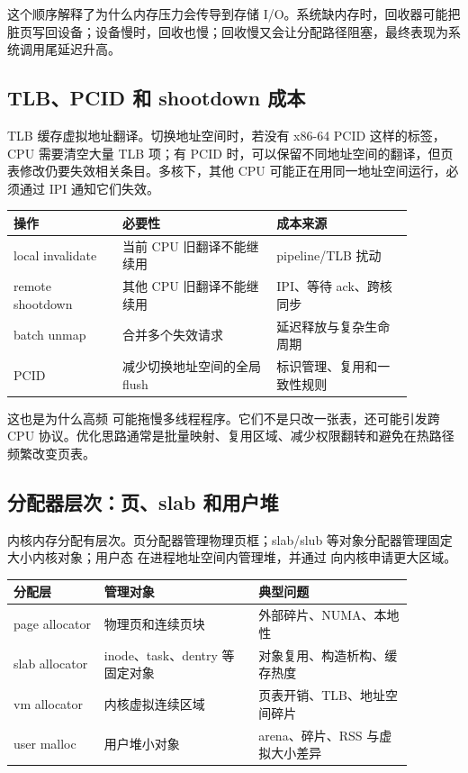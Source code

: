 这个顺序解释了为什么内存压力会传导到存储 I/O。系统缺内存时，回收器可能把脏页写回设备；设备慢时，回收也慢；回收慢又会让分配路径阻塞，最终表现为系统调用尾延迟升高。

\subsection{TLB、PCID 和 shootdown 成本}

TLB 缓存虚拟地址翻译。切换地址空间时，若没有 x86-64 PCID 这样的标签，CPU 需要清空大量 TLB 项；有 PCID 时，可以保留不同地址空间的翻译，但页表修改仍要失效相关条目。多核下，其他 CPU 可能正在用同一地址空间运行，必须通过 IPI 通知它们失效。

\begin{longtable}{|p{0.24\linewidth}|p{0.34\linewidth}|p{0.3\linewidth}|}
\toprule
操作 & 必要性 & 成本来源 \\
\midrule
local invalidate & 当前 CPU 旧翻译不能继续用 & pipeline/TLB 扰动 \\\tablerowrule
remote shootdown & 其他 CPU 旧翻译不能继续用 & IPI、等待 ack、跨核同步 \\\tablerowrule
batch unmap & 合并多个失效请求 & 延迟释放与复杂生命周期 \\\tablerowrule
PCID & 减少切换地址空间的全局 flush & 标识管理、复用和一致性规则 \\
\bottomrule
\end{longtable}

这也是为什么高频  可能拖慢多线程程序。它们不是只改一张表，还可能引发跨 CPU 协议。优化思路通常是批量映射、复用区域、减少权限翻转和避免在热路径频繁改变页表。

\subsection{分配器层次：页、slab 和用户堆}

内核内存分配有层次。页分配器管理物理页框；slab/slub 等对象分配器管理固定大小内核对象；用户态  在进程地址空间内管理堆，并通过  向内核申请更大区域。

\begin{longtable}{|p{0.2\linewidth}|p{0.34\linewidth}|p{0.34\linewidth}|}
\toprule
分配层 & 管理对象 & 典型问题 \\
\midrule
page allocator & 物理页和连续页块 & 外部碎片、NUMA、本地性 \\\tablerowrule
slab allocator & inode、task、dentry 等固定对象 & 对象复用、构造析构、缓存热度 \\\tablerowrule
vm allocator & 内核虚拟连续区域 & 页表开销、TLB、地址空间碎片 \\\tablerowrule
user malloc & 用户堆小对象 & arena、碎片、RSS 与虚拟大小差异 \\
\bottomrule
\end{longtable}

